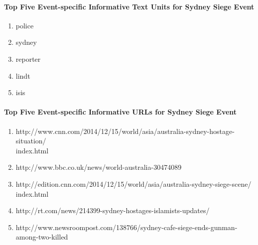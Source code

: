 \paragraph{Top Five Event-specific Informative Text Units for Sydney Siege Event}
\begin{enumerate}
\item police
\item sydney
\item reporter
\item lindt
\item isis                                                                                                                                                                                                                                                                                                                                                                                                                                                                                                                
\end{enumerate}

\paragraph{Top Five Event-specific Informative URLs for Sydney Siege Event}
\begin{enumerate}
\item http://www.cnn.com/2014/12/15/world/asia/australia-sydney-hostage-situation/\\index.html
\item http://www.bbc.co.uk/news/world-australia-30474089
\item http://edition.cnn.com/2014/12/15/world/asia/australia-sydney-siege-scene/\\index.html
\item http://rt.com/news/214399-sydney-hostages-islamists-updates/ 
\item http://www.newsroompost.com/138766/sydney-cafe-siege-ends-gunman-among-two-killed                                                                                                                                                                                                                                                                                                                                                                                                                                                                                                                
\end{enumerate}

